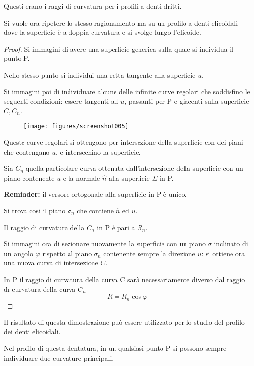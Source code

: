 \documentclass[a4paper, 15pt]{article}
\begin{document}
\begin{adjustwidth}{2in}{}
	Questi erano i raggi di curvatura per i profili a denti dritti. \newline 
	
	Si vuole ora ripetere lo stesso ragionamento ma su un profilo a denti elicoidali dove la superficie è a doppia curvatura e si svolge lungo l'elicoide.
	
	\begin{proof}
		Si immagini di avere una superficie generica sulla quale si individua il punto P. 
		
		Nello stesso punto si individui una retta tangente alla superficie $u$. 
		
		Si immagini poi di individuare alcune delle infinite curve regolari che soddisfino le seguenti condizioni: essere tangenti ad $u$, passanti per P e giacenti sulla superficie $C, C_n$. 
		
		\begin{figure}[H]
			\centering
			\texttt{[image: figures/screenshot005]}
			\label{fig:shot005}
		\end{figure}
		
		Queste curve regolari si ottengono per intersezione della superficie con dei piani che contengano $u$. e intersechino la superficie. 
		
		Sia $C_n$ quella particolare curva ottenuta dall'intersezione  della superficie con un piano contenente $u$ e la normale $\hat{n}$ alla superficie $\Sigma$ in P. 
		
		\textbf{Reminder:} il versore ortogonale alla superficie in P è unico. 
		
		Si trova così il piano $\sigma_n$ che contiene $\hat{n}$ ed $u$. \newline 
		
		Il raggio di curvatura della $C_n$ in P è pari a $R_n$.
		
		Si immagini ora di sezionare nuovamente la superficie con un piano $\sigma$ inclinato di un angolo $\varphi$ rispetto al piano $\sigma_n$ contenente sempre la direzione $u$: si ottiene ora una nuova curva di intersezione $C$. 
		
		In P il raggio di curvatura della curva C sarà necessariamente diverso dal raggio di curvatura della curva $C_n$ 
		\[R = R_n\cos\varphi \]
	\end{proof}

Il risultato di questa dimostrazione può essere utilizzato per lo studio del profilo dei denti elicoidali. 

Nel profilo di questa dentatura, in un qualsiasi punto P si possono sempre individuare due curvature principali. 


\end{adjustwidth}
\end{document}
